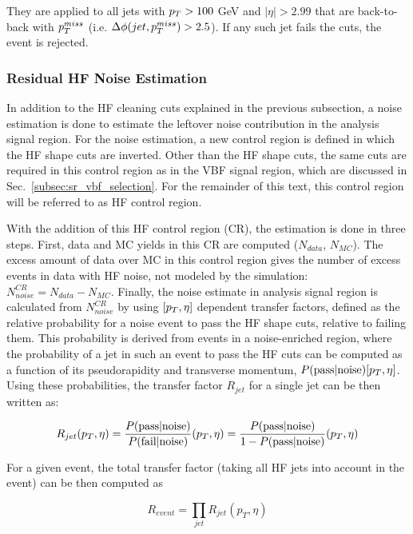 They are applied to all jets with $p_T > 100$ GeV and $|\eta| > 2.99$ that are back-to-back with $p_T^{miss}$
(i.e. $\Delta\phi(jet,p_T^{miss}) > 2.5$). If any such jet fails the cuts, the event is rejected. 


\subsubsection{Residual HF Noise Estimation}
\label{subsubsec:hf_noise_est}

In addition to the HF cleaning cuts explained in the previous subsection,
a noise estimation is done to estimate the leftover noise contribution in  
the analysis signal region. For the noise estimation, a new control region is defined
in which the HF shape cuts are inverted. Other than the HF shape cuts,
the same cuts are required in this control region as in the VBF signal region, which are
discussed in Sec.~\ref{subsec:sr_vbf_selection}. For the remainder of this text, this control
region will be referred to as HF control region.

With the addition of this HF control region (CR), the estimation is done in three steps.
First, data and MC yields in this CR are computed ($N_{data}$, $N_{MC}$). The excess amount of data over MC 
in this control region gives the number of excess events in data with HF noise, not modeled by the 
simulation: $N_{noise}^{CR} = N_{data} - N_{MC}$. 
Finally, the noise estimate in analysis signal region is calculated from $N_{noise}^{CR}$ by using $[p_T, \eta]$ dependent transfer factors,
defined as the relative probability for a noise event to pass the HF shape cuts, relative to failing them.
This probability is derived from events in a noise-enriched region, where the probability of a jet in such an event
to pass the HF cuts can be computed as a function of its pseudorapidity and transverse momentum, $P( \text{pass} | \text{noise} )[p_{T}, \eta]$.
Using these probabilities, the transfer factor $R_{jet}$ for a single jet can be then written as:

\begin{equation}
    R_{jet} (p_T, \eta) = \frac{P( \text{pass} | \text{noise} )}{P( \text{fail} | \text{noise} )} (p_T, \eta) = \frac{P( \text{pass} | \text{noise} )}{1 - P( \text{pass} | \text{noise} )} (p_T, \eta)
\end{equation}

For a given event, the total transfer factor (taking all HF jets into account in the event) can be then computed as

\begin{equation}
    R_{event} = \prod_{jet} R_{jet} (p_T, \eta)
\end{equation}

